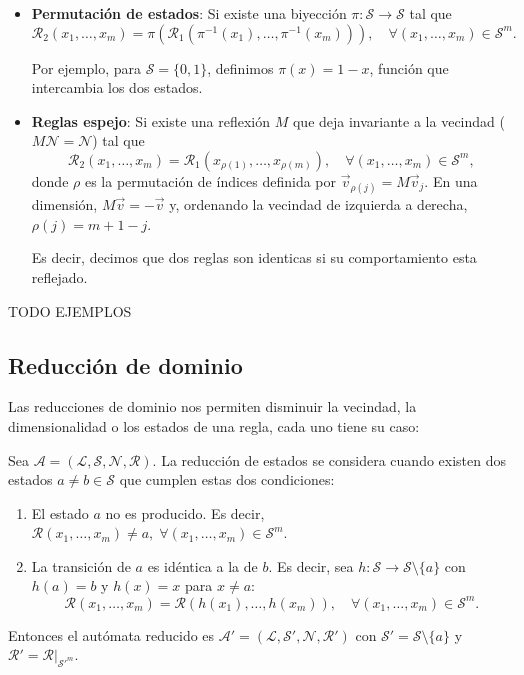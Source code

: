 \begin{itemize}
	\item \textbf{Permutación de estados}: Si existe una biyección $\pi : \mathcal{S} \to \mathcal{S}$ tal que
	\[
	\mathcal{R}_2(x_1, \dots, x_m) = \pi\left( \mathcal{R}_1\left( \pi^{-1}(x_1), \dots, \pi^{-1}(x_m) \right) \right), \quad \forall (x_1, \dots, x_m) \in \mathcal{S}^m.
	\]
	
	Por ejemplo, para $\mathcal{S} = \{0, 1\}$, definimos $\pi(x) = 1 - x$, función que intercambia los dos estados.
	
	\item \textbf{Reglas espejo}:
	Si existe una reflexión $M$ que deja invariante a la vecindad ($M\mathcal{N} = \mathcal{N}$) tal que
	\[
	\mathcal{R}_2(x_1, \dots, x_m) = \mathcal{R}_1\left( x_{\rho(1)}, \dots, x_{\rho(m)} \right), \quad \forall (x_1, \dots, x_m) \in \mathcal{S}^m,
	\]
	donde $\rho$ es la permutación de índices definida por $\vec{v}_{\rho(j)} = M \vec{v}_j$. En una dimensión, $M\vec{v} = -\vec{v}$ y, ordenando la vecindad de izquierda a derecha, $\rho(j) = m + 1 - j$.
	
	Es decir, decimos que dos reglas son identicas si su comportamiento esta reflejado. 
\end{itemize}

TODO EJEMPLOS

\subsection{Reducción de dominio}

Las reducciones de dominio nos permiten disminuir la vecindad, la dimensionalidad o los estados de una regla, cada uno tiene su caso:

Sea $\mathcal{A} = (\mathcal{L}, \mathcal{S}, \mathcal{N}, \mathcal{R})$. La reducción de estados se considera cuando existen dos estados $a \neq b \in \mathcal{S}$ que cumplen estas dos condiciones:
\begin{enumerate}
	\item El estado $a$ no es producido. Es decir, $\mathcal{R}(x_1, \dots, x_m) \neq a, \; \forall (x_1, \dots, x_m) \in \mathcal{S}^m$.
	\item La transición de $a$ es idéntica a la de $b$. Es decir, sea $h : \mathcal{S} \to \mathcal{S} \setminus \{a\}$ con $h(a) = b$ y $h(x) = x$ para $x \neq a$:
	\[
	\mathcal{R}(x_1, \dots, x_m) = \mathcal{R}\left( h(x_1), \dots, h(x_m) \right), \quad \forall (x_1, \dots, x_m) \in \mathcal{S}^m.
	\]
\end{enumerate}
Entonces el autómata reducido es $\mathcal{A}' = (\mathcal{L}, \mathcal{S}', \mathcal{N}, \mathcal{R}')$ con $\mathcal{S}' = \mathcal{S} \setminus \{a\}$ y $\mathcal{R}' = \mathcal{R}|_{\mathcal{S}'^m}$.


